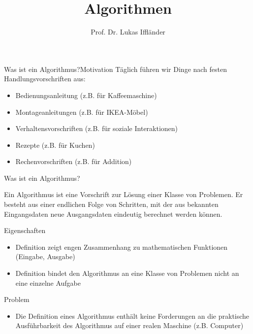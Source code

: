 \documentclass[xelatex,aspectratio=169]{beamer}
\title{Algorithmen}
\author{Prof. Dr. Lukas Iffländer}
\institute{HTW Dresden}
\date{}
\begin{document}
\begin{frame}
  \titlepage
\end{frame}

\begin{frame}{Was ist ein Algorithmus?}{Motivation}
  Täglich führen wir Dinge nach festen Handlungsvorschriften aus:
  \begin{itemize}
    \item Bedienungsanleitung (z.B. für Kaffeemaschine)
    \item Montageanleitungen (z.B. für IKEA-Möbel)
    \item Verhaltensvorschriften (z.B. für soziale Interaktionen)
    \item Rezepte (z.B. für Kuchen)
    \item Rechenvorschriften (z.B. für Addition)
  \end{itemize}

\end{frame}

\begin{frame}{Was ist ein Algorithmus?}
  \begin{definition}
    Ein Algorithmus ist eine Vorschrift zur Lösung einer Klasse von
    Problemen. Er besteht aus einer endlichen Folge von Schritten,
    mit der aus bekannten Eingangsdaten neue Ausgangsdaten eindeutig berechnet werden können.
  \end{definition}

  \begin{block}{Eigenschaften}
    \begin{itemize}
      \item Definition zeigt engen Zusammenhang zu mathematischen Funktionen (Eingabe, Ausgabe)
      \item Definition bindet den Algorithmus an eine Klasse von Problemen nicht an eine einzelne Aufgabe
    \end{itemize}
  \end{block}

  \begin{alertblock}{Problem}
    \begin{itemize}
      \item Die Definition eines Algorithmus enthält keine Forderungen an die praktische Ausführbarkeit des Algorithmus auf einer realen Maschine (z.B. Computer)
    \end{itemize}
  \end{alertblock}

\end{frame}

\end{document}
